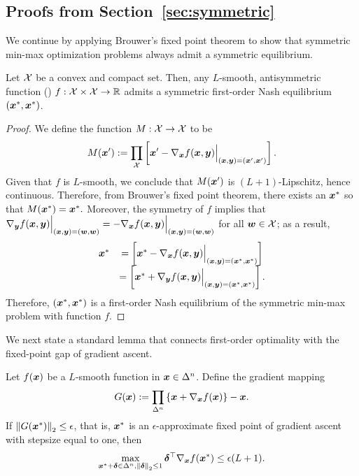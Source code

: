 \subsection{Proofs from Section~\ref{sec:symmetric}}
\label{sec:proofs2}

We continue by applying Brouwer's fixed point theorem to show that symmetric min-max optimization problems always admit a symmetric equilibrium.

\begin{lemma}\label{lem:exists}
Let $\mathcal{X}$ be a convex and compact set. Then, any $L$-smooth, antisymmetric function () $f:\mathcal{X}\times \mathcal{X} \to \mathbb{R}$ admits a symmetric first-order Nash equilibrium $({\bm{x}}^*,{\bm{x}}^*)$.
\end{lemma}

\begin{proof}
We define the function $M: \mathcal{X} \to \mathcal{X}$ to be
\begin{equation}
M({\bm{x}}') := \prod_{\mathcal{X}} \left[{\bm{x}}' - \nabla _{{\bm{x}}}  f({\bm{x}},{\bm{y}})\Big|_{({\bm{x}},{\bm{y}})=({\bm{x}}',{\bm{x}}')} \right].
\end{equation}
Given that $f$ is $L$-smooth, we conclude that $M({\bm{x}}')$ is $(L+1)$-Lipschitz, hence continuous. Therefore, from Brouwer's fixed point theorem, there exists an ${\bm{x}}^*$ so that $M({\bm{x}}^*) = {\bm{x}}^*.$ Moreover, the symmetry of $f$ implies that $\nabla_{{\bm{y}}}f({\bm{x}},{\bm{y}}) \Big|_{({\bm{x}},{\bm{y}})=({\bm{w}},{\bm{w}})} =-\nabla_{{\bm{x}}}f({\bm{x}},{\bm{y}}) \Big|_{({\bm{x}},{\bm{y}})=({\bm{w}},{\bm{w}})} $ for all ${\bm{w}}\in\mathcal{X}$; as a result,
\begin{equation*}
    \begin{array}{cc}
    {\bm{x}}^* &= \left[{\bm{x}}^* - \nabla _{{\bm{x}}}  f({\bm{x}},{\bm{y}})\Big|_{({\bm{x}},{\bm{y}})=({\bm{x}}^*,{\bm{x}}^*)} \right] \\
    &= \left[{\bm{x}}^* + \nabla _{{\bm{y}}}  f({\bm{x}},{\bm{y}})\Big|_{({\bm{x}},{\bm{y}})=({\bm{x}}^*,{\bm{x}}^*)} \right].
    \end{array} 
\end{equation*}
Therefore, $({\bm{x}}^*,{\bm{x}}^*)$ is a first-order Nash equilibrium of the symmetric min-max problem with function $f$. 
\end{proof}

We next state a standard lemma that connects first-order optimality with the fixed-point gap of gradient ascent.

\begin{lemma}[\citep{ghadimi2016accelerated}, Lemma 3 for $c=1$]\label{lem:approxsmooth} Let $f({\bm{x}})$ be a $L$-smooth function in ${\bm{x}} \in \Delta^n$. Define the gradient mapping 
\[G({\bm{x}}) := \prod_{\Delta^n}
\left\{{\bm{x}}+\nabla_{{\bm{x}}}f({\bm{x}})\right\}-{\bm{x}}.\]
If $\left\| G({\bm{x}}^*) \right\|_2 \leq \epsilon$, that is, ${\bm{x}}^*$ is an $\epsilon$-approximate fixed point of gradient ascent with stepsize equal to one, then
\[
\max_{{\bm{x}}^*+\bm{\delta} \in \Delta^n, \left\| \bm{\delta} \right\|_2\leq 1} \bm{\delta}^{\top}\nabla_{{\bm{x}}} f({\bm{x}}^*) \leq \epsilon(L+1).
\]
\end{lemma}

